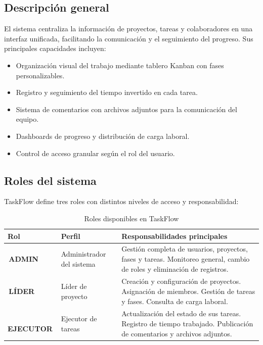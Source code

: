 \documentclass[12pt, a4paper]{article}
\newcommand{\rolbadge}[2]{%
  \colorbox{#1}{\color{white}\footnotesize\bfseries\,#2\,}%
}
\newcommand{\admin}{\rolbadge{admincolor}{ADMIN}}
\newcommand{\leader}{\rolbadge{leadercolor}{LÍDER}}
\newcommand{\executor}{\rolbadge{executorcolor}{EJECUTOR}}
\begin{document}
\subsection{Descripción general}

El sistema centraliza la información de proyectos, tareas y colaboradores en una interfaz unificada, facilitando la comunicación y el seguimiento del progreso. Sus principales capacidades incluyen:

\begin{itemize}
  \item Organización visual del trabajo mediante tablero Kanban con fases personalizables.
  \item Registro y seguimiento del tiempo invertido en cada tarea.
  \item Sistema de comentarios con archivos adjuntos para la comunicación del equipo.
  \item Dashboards de progreso y distribución de carga laboral.
  \item Control de acceso granular según el rol del usuario.
\end{itemize}

\subsection{Roles del sistema}

TaskFlow define tres roles con distintos niveles de acceso y responsabilidad:

\begin{table}[H]
\centering
\begin{tabularx}{\textwidth}{C{2.2cm} L{4cm} L{7.5cm}}
\toprule
\textbf{Rol} & \textbf{Perfil} & \textbf{Responsabilidades principales} \\
\midrule
\admin & Administrador del sistema &
  Gestión completa de usuarios, proyectos, fases y tareas.
  Monitoreo general, cambio de roles y eliminación de registros. \\
\addlinespace
\leader & Líder de proyecto &
  Creación y configuración de proyectos. Asignación de miembros.
  Gestión de tareas y fases. Consulta de carga laboral. \\
\addlinespace
\executor & Ejecutor de tareas &
  Actualización del estado de sus tareas. Registro de tiempo trabajado.
  Publicación de comentarios y archivos adjuntos. \\
\bottomrule
\end{tabularx}
\caption{Roles disponibles en TaskFlow}
\end{table}
\end{document}
